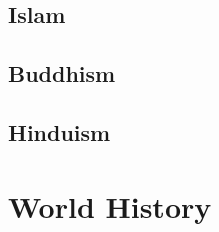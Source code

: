 		\subsection{Islam}
		\subsection{Buddhism}
		\subsection{Hinduism}
		\subsection{}
	\section{World History}
	